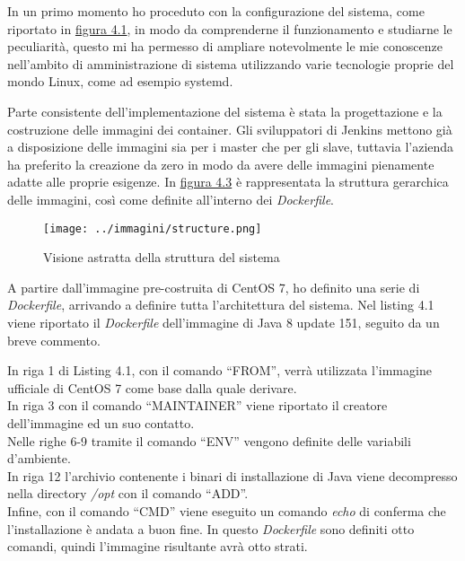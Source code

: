 In un primo momento ho proceduto con la configurazione del sistema, come riportato in \hyperref[fig:impl1]{figura 4.1}, in modo da comprenderne il funzionamento e studiarne le peculiarità, questo mi ha permesso di ampliare notevolmente le mie conoscenze nell'ambito di amministrazione di sistema utilizzando varie tecnologie proprie del mondo \gls{Linux}, come ad esempio \gls{systemd}. 

Parte consistente dell'implementazione del sistema è stata la progettazione e la costruzione delle immagini dei \gls{container}. Gli sviluppatori di Jenkins mettono già a disposizione delle immagini sia per i \gls{master} che per gli \gls{slave}, tuttavia l'azienda ha preferito la creazione da zero in modo da avere delle immagini pienamente adatte alle proprie esigenze. In \hyperref[fig:images]{figura 4.3} è rappresentata la struttura gerarchica delle immagini, così come definite all'interno dei \textit{Dockerfile}.
\begin{figure}[H]
    \capstart
    \centering
    \texttt{[image: ../immagini/structure.png]}
    \caption{Visione astratta della struttura del sistema}
    \label{fig:images}
\end{figure}

A partire dall'immagine pre-costruita di \gls{CentOS} 7, ho definito una serie di \textit{Dockerfile}, arrivando a definire tutta l'architettura del sistema. Nel listing 4.1 viene riportato il \textit{Dockerfile} dell'immagine di Java 8 update 151, seguito da un breve commento.

  

In riga 1 di Listing 4.1, con il comando ``FROM'', verrà utilizzata l'immagine ufficiale di \gls{CentOS} 7 come base dalla quale derivare. \\
In riga 3 con il comando ``MAINTAINER'' viene riportato il creatore dell'immagine ed un suo contatto. \\
Nelle righe 6-9 tramite il comando ``ENV'' vengono definite delle variabili d'ambiente. \\
In riga 12 l'archivio contenente i binari di installazione di Java viene decompresso nella directory \textit{/opt} con il comando ``ADD''. \\
Infine, con il comando ``CMD'' viene eseguito un comando \textit{echo} di conferma che l'installazione è andata a buon fine. In questo \textit{Dockerfile} sono definiti otto comandi, quindi l'immagine risultante avrà otto strati.\\

